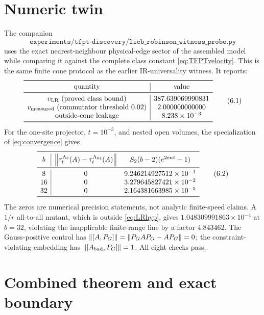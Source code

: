 \section{Numeric twin}

The companion
\[
 \texttt{experiments/tfpt-discovery/lieb\_robinson\_witness\_probe.py}
\]
uses the exact nearest-neighbour physical-edge sector of the assembled
model while comparing it against the complete class constant
\eqref{eq:TFPTvelocity}.  This is the same finite cone protocol as the
earlier IR-universality witness.  It reports:
\[
\begin{array}{c|c}
\toprule
\text{quantity}&\text{value}\\
\midrule
v_{\rm LR}\text{ (proved class bound)}&387.639069990831\\
v_{\rm measured}\text{ (commutator threshold }0.02)&2.000000000000\\
\text{outside-cone leakage}&8.238\times10^{-3}\\
\bottomrule
\end{array}
\tag{6.1}\label{eq:numericvelocity}
\]
For the one-site projector, \(t=10^{-3}\), and nested open volumes, the
specialization of \eqref{eq:convergence} gives
\[
\begin{array}{c|cc}
\toprule
b&\norm{\tau_t^{\Lambda_b}(A)-\tau_t^{\Lambda_{64}}(A)}
&S_2(b-2)(e^{2e\kappa t}-1)\\
\midrule
8&0&9.246214927512\times10^{-1}\\
16&0&3.279645827421\times10^{-2}\\
32&0&2.164381663985\times10^{-5}\\
\bottomrule
\end{array}
\tag{6.2}\label{eq:numericconvergence}
\]
The zeros are numerical precision statements, not analytic finite-speed
claims.  A \(1/r\) all-to-all mutant, which is outside
\eqref{eq:LRhyp}, gives \(1.048309991863\times10^{-4}\) at \(b=32\),
violating the inapplicable finite-range line by a factor \(4.843462\).
The Gauss-positive control has
\(\left\lVert[A,P_G]\right\rVert=\left\lVert P_GAP_G-AP_G\right\rVert=0\); the constraint-violating
embedding has \(\left\lVert[A_{\rm bad},P_G]\right\rVert=1\).  All eight checks pass.

\section{Combined theorem and exact boundary}

